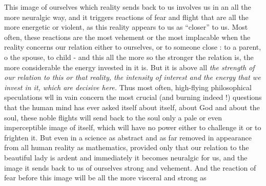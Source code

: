 This image of ourselves which reality sends back to us involves us in an all the more neuralgic way, and it triggers reactions of fear and flight that are all the more energetic or violent, as this reality appears to us as ``closer'' to us. Most often, these reactions are the most vehement or the most implacable when the reality concerns our relation either to ourselves, or to someone close : to a parent, o the spouse, to  child - and this all the more so the stronger the relation is, the more considerable the energy invested in it is. But it is above all \textit{the strength of our relation to this or that reality, the intensity of interest and the energy that we invest in it, which are decisive here.} Thus most often, high-flying philosophical speculations  wll in vain concern the most crucial (and burning indeed !) questions that the human mind has ever asked itself about itself, about God and about the soul, these noble flights will send back to the soul only a pale or even imperceptible image of itself, which will have no power either to challenge it or to frighten it. But even in a science as abstract and as far removed in appearance from all human reality as mathematics, provided only that our relation to the beautiful lady is ardent and immediately it becomes neuralgic for us, and the image it sends back to us of ourselves strong and vehement. And the reaction of fear before this image will be all the more visceral and strong as
\margin{$\cdot$}
\margin{$\cdot$}
\margin{$\cdot\ \cdot$}

